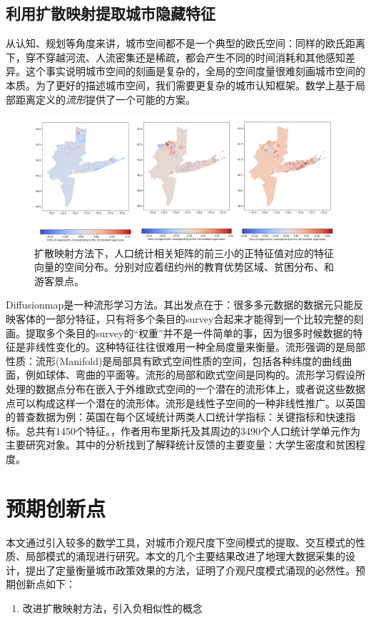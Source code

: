 \subsection{利用扩散映射提取城市隐藏特征}

从认知、规划等角度来讲，城市空间都不是一个典型的欧氏空间：同样的欧氏距离下，穿不穿越河流、人流密集还是稀疏，都会产生不同的时间消耗和其他感知差异。这个事实说明城市空间的刻画是复杂的，全局的空间度量很难刻画城市空间的本质。为了更好的描述城市空间，我们需要更复杂的城市认知框架。数学上基于局部距离定义的\textit{流形}提供了一个可能的方案。

\begin{figure}
    \centering
    \includegraphics[width = 0.99\linewidth]{Figs/diffusionmap.png}
    \caption{扩散映射方法下，人口统计相关矩阵的前三小的正特征值对应的特征向量的空间分布。分别对应着纽约州的教育优势区域、贫困分布、和游客景点。}
    \label{fig:diffusionmap}
\end{figure}

Diffusionmap是一种流形学习方法。其出发点在于：很多多元数据的数据元只能反映客体的一部分特征，只有将多个条目的survey合起来才能得到一个比较完整的刻画。提取多个条目的survey的“权重”并不是一件简单的事，因为很多时候数据的特征是非线性变化的。这种特征往往很难用一种全局度量来衡量。流形强调的是局部性质：流形(Manifold)是局部具有欧式空间性质的空间，包括各种纬度的曲线曲面，例如球体、弯曲的平面等。流形的局部和欧式空间是同构的。流形学习假设所处理的数据点分布在嵌入于外维欧式空间的一个潜在的流形体上，或者说这些数据点可以构成这样一个潜在的流形体。流形是线性子空间的一种非线性推广。以英国的普查数据为例：英国在每个区域统计两类人口统计学指标：关键指标和快速指标。总共有1450个特征。\cite{barter2019manifold}，作者用布里斯托及其周边的3490个人口统计学单元作为主要研究对象。其中的分析找到了解释统计反馈的主要变量：大学生密度和贫困程度。



\section{预期创新点}

本文通过引入较多的数学工具，对城市介观尺度下空间模式的提取、交互模式的性质、局部模式的涌现进行研究。本文的几个主要结果改进了地理大数据采集的设计，提出了定量衡量城市政策效果的方法，证明了介观尺度模式涌现的必然性。预期创新点如下：\begin{enumerate}
    \item 改进扩散映射方法，引入负相似性的概念
\end{enumerate}